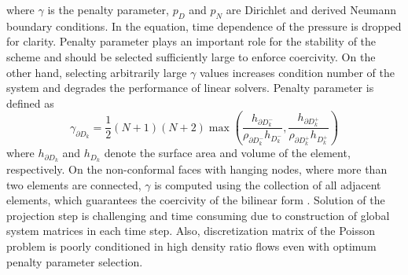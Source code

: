 \documentclass[11pt,a4paper,twoside]{article}
\begin{document}
	where $ \gamma $ is the penalty parameter, $ p_D $ and $ p_N $ are Dirichlet and derived Neumann boundary conditions. In the equation, time dependence of the pressure is dropped for clarity. Penalty parameter plays an important role for the stability of the scheme and should be selected sufficiently large to enforce coercivity. On the other hand, selecting  arbitrarily large $ \gamma $ values  increases condition number of the system and degrades the performance of linear solvers. Penalty parameter is defined as
	\begin{equation}
	\label{Eq.Ch2.PenaltyParameter}
	\gamma_{\partial D_k}=\frac{1}{2}(N+1)(N+2)\max\left(\frac{ h_{\partial D_{k}^-} } {\rho_{\partial D_{k}^-} h_{D_{k}^-}   }, \frac{ h_{\partial D_{k}^+} } {\rho_{\partial D_{k}^+} h_{D_{k}^+}   }\right)
	\end{equation}
	where $ h_{\partial D_{k}} $ and $ h_{D_{k}} $ denote the surface area and volume of the element, respectively.  On the non-conformal faces with hanging nodes, where more than two elements are connected,  $ \gamma $ is computed using the collection of all adjacent elements, which guarantees the coercivity of the bilinear form \cite{shahbazi_explicit_2005}. Solution of the projection step is challenging and time consuming  due to construction of  global system matrices in each time step.  Also,  discretization matrix of the Poisson problem is poorly conditioned in high density ratio flows even with optimum penalty parameter selection.
	
\end{document}
